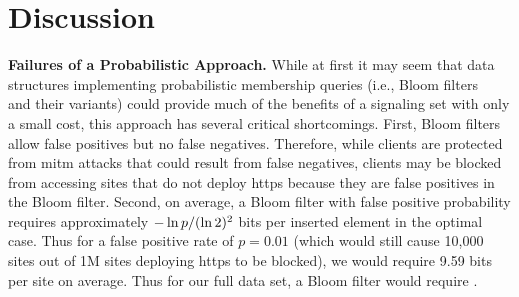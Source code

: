 \section{Discussion}
\label{sec:discussion}


\textbf{Failures of a Probabilistic Approach.} While at first it may seem that
data structures implementing probabilistic membership queries (i.e., Bloom
filters~\cite{bloom1970space} and their variants) could provide much of the
benefits of a signaling set with only a small cost, this approach has several
critical shortcomings. First, Bloom filters allow false positives but no false
negatives. Therefore, while clients are protected from \ac{mitm} attacks that
could result from false negatives, clients may be blocked from accessing sites
that do not deploy \ac{https} because they are false positives in the Bloom
filter. Second, on average, a Bloom filter with false positive probability
\bloomfpp requires approximately $-\ln p/(\ln 2)^2$ bits per inserted
element in the optimal case. Thus for a false positive rate of $p = 0.01$ (which
would still cause 10,000 sites out of 1M sites deploying \ac{https} to be
blocked), we would require 9.59 bits per site on average. Thus for our full data
set, a Bloom filter would require .
